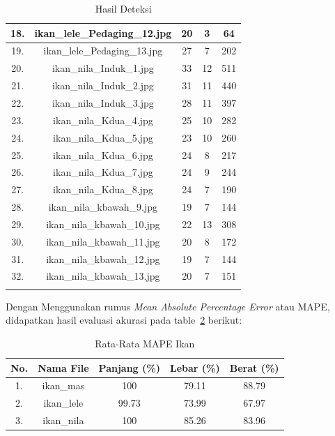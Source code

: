 \begin{longtable}{|c|c|c|c|c|}
        18. & ikan\_lele\_Pedaging\_12.jpg & 20 & 3 & 64 \\
        \hline
        19. & ikan\_lele\_Pedaging\_13.jpg & 27 & 7 & 202 \\
        \hline
        20. & ikan\_nila\_Induk\_1.jpg & 33 & 12 & 511 \\
        \hline
        21. & ikan\_nila\_Induk\_2.jpg & 31 & 11 & 440 \\
        \hline
        22. & ikan\_nila\_Induk\_3.jpg & 28 & 11 & 397 \\
        \hline
        23. & ikan\_nila\_Kdua\_4.jpg & 25 & 10 & 282 \\
        \hline
        24. & ikan\_nila\_Kdua\_5.jpg & 23 & 10 & 260 \\
        \hline
        25. & ikan\_nila\_Kdua\_6.jpg & 24 & 8 & 217 \\
        \hline
        26. & ikan\_nila\_Kdua\_7.jpg & 24 & 9 & 244 \\
        \hline
        27. & ikan\_nila\_Kdua\_8.jpg & 24 & 7 & 190 \\
        \hline
        28. & ikan\_nila\_kbawah\_9.jpg & 19 & 7 & 144 \\
        \hline
        29. & ikan\_nila\_kbawah\_10.jpg & 22 & 13 & 308 \\
        \hline
        30. & ikan\_nila\_kbawah\_11.jpg & 20 & 8 & 172 \\
        \hline
        31. & ikan\_nila\_kbawah\_12.jpg & 19 & 7 & 144 \\
        \hline
        32. & ikan\_nila\_kbawah\_13.jpg & 20 & 7 & 151 \\
        \hline
    \caption{Hasil Deteksi}\label{tab:Hasil Deteksi}
\end{longtable}

Dengan Menggunakan rumus \emph{Mean Absolute Percentage Error} atau MAPE, didapatkan hasil evaluasi akurasi pada table~\ref{tab:MAPE} berikut:

\begin{table}[H]
    \centering
    \begin{tabular}{|c|c|c|c|c|}
        \hline
        No. & Nama File & Panjang (\%) & Lebar (\%) & Berat (\%) \\
        \hline
        1. & ikan\_mas & 100 & 79.11 & 88.79 \\
        \hline
        2. & ikan\_lele & 99.73 & 73.99 & 67.97 \\
        \hline
        3. & ikan\_nila & 100 & 85.26 & 83.96 \\
        \hline
    \end{tabular}
\caption{Rata-Rata MAPE Ikan}\label{tab:MAPE}
\end{table}

